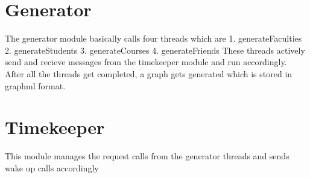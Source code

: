 \hypertarget{index_Generator}{}\section{\-Generator}\label{index_Generator}
\-The generator module basically calls four threads which are 1. generate\-Faculties 2. generate\-Students 3. generate\-Courses 4. generate\-Friends \-These threads actively send and recieve messages from the timekeeper module and run accordingly. \-After all the threads get completed, a graph gets generated which is stored in graphml format. \hypertarget{index_Timekeeper}{}\section{\-Timekeeper}\label{index_Timekeeper}
\-This module manages the request calls from the generator threads and sends wake up calls accordingly 